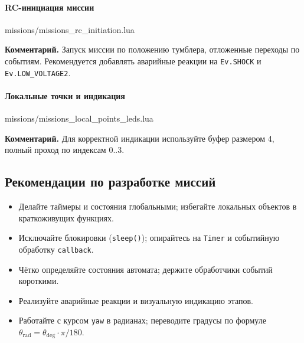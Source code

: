 \paragraph{RC-инициация миссии}
\begin{codefile}{missions/missions_rc_initiation.lua}
\end{codefile}
\textbf{Комментарий.} Запуск миссии по положению тумблера, отложенные переходы по событиям. Рекомендуется добавлять аварийные реакции на \texttt{Ev.SHOCK} и \texttt{Ev.LOW\_VOLTAGE2}.

\paragraph{Локальные точки и индикация}
\begin{codefile}{missions/missions_local_points_leds.lua}
\end{codefile}
\textbf{Комментарий.} Для корректной индикации используйте буфер размером 4, полный проход по индексам 0..3.

\subsection{Рекомендации по разработке миссий}
\begin{itemize}
  \item Делайте таймеры и состояния глобальными; избегайте локальных объектов в краткоживущих функциях.
  \item Исключайте блокировки (\texttt{sleep()}); опирайтесь на \texttt{Timer} и событийную обработку \texttt{callback}.
  \item Чётко определяйте состояния автомата; держите обработчики событий короткими.
  \item Реализуйте аварийные реакции и визуальную индикацию этапов.
  \item Работайте с курсом \texttt{yaw} в радианах; переводите градусы по формуле \(\theta_{\mathrm{rad}}=\theta_{\mathrm{deg}}\cdot\pi/180\).
\end{itemize}
